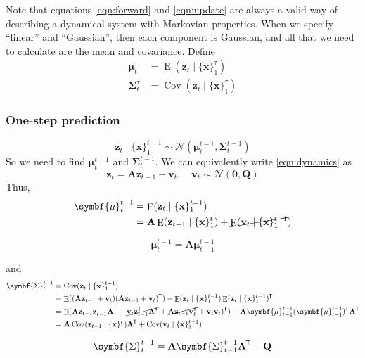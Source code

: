 \documentclass[11pt]{article}
\DeclareMathOperator{\E}{E}
\DeclareMathOperator{\Cov}{Cov}
\newcommand{\xb}{\mathbf{x}}
\newcommand{\zb}{\mathbf{z}}
\newcommand{\ub}{\symbf{\mu}}
\newcommand{\Sb}{\symbf{\Sigma}}
\newcommand{\Ab}{\mathbf{A}}
\newcommand{\Qb}{\mathbf{Q}}
\newcommand*{\tran}{^{\mkern-1.5mu\mathsf{T}}}
\begin{document}
Note that equations \eqref{eqn:forward} and \eqref{eqn:update} are always a
valid way of describing a dynamical system with Markovian properties. When
we specify ``linear'' and ``Gaussian'', then each component is Gaussian, and
all that we need to calculate are the mean and covariance. Define
\begin{align*}
  \ub_t^{\tau} &= \E(\zb_t \mid \{\xb\}_1^{\tau}) \\
  \Sb_t^{\tau} &= \Cov(\zb_t \mid \{\xb\}_1^{\tau})
\end{align*}

\subsubsection*{One-step prediction}
\begin{equation*}
  \zb_t \mid \{\xb\}_1^{t-1} \sim \mathcal{N}(\ub_t^{t-1}, \Sb_t^{t-1})
\end{equation*}
So we need to find $\ub_t^{t-1}$ and $\Sb_t^{t-1}$. We can equivalently write
\eqref{eqn:dynamics} as
\begin{equation*}
  \zb_t = \Ab \zb_{t-1} + \mathbf{v}_t, \quad \mathbf{v}_t \sim
    \mathcal{N}(\mathbf{0}, \Qb)
\end{equation*}
Thus,
\begin{align*}
  \ub_t^{t-1} &= \E(\zb_t \mid \{\xb\}_1^{t-1}) \\
  &= \Ab  \E(\zb_{t-1} \mid \{\xb\}_1^{t}) +
    \cancel{\E(\mathbf{v}_t \mid \{\xb\}_1^{t-1})}
\end{align*}
\begin{framed}
  \begin{equation}
    \ub_t^{t-1} = \Ab \ub_{t-1}^{t-1}
  \end{equation}
\end{framed}
and
\begin{align*}
  \Sb_t^{t-1} &= \Cov(\zb_t \mid \{\xb\}_1^{t-1}) \\
  &= \E((\Ab \zb_{t-1} + \mathbf{v}_t) (\Ab \zb_{t-1} + \mathbf{v}_t)\tran) -
     \E(\zb_t \mid \{\xb\}_1^{t-1}) \E(\zb_t \mid \{\xb\}_1^{t-1})\tran \\
  &= \E(\Ab \zb_{t-1} \zb_{t-1}\tran \Ab\tran +
      \cancel{\mathbf{v}_t \zb_{t-1}\tran \Ab\tran} +
      \cancel{\Ab \zb_{t-1} \mathbf{v}_t\tran} +
      \mathbf{v}_t \mathbf{v}_t)\tran) -
      \Ab \ub_{t-1}^{t-1} (\ub_{t-1}^{t-1})\tran \Ab\tran \\
  &= \Ab  \Cov(\zb_{t-1} \mid \{\xb\}_1^{t}) \Ab\tran +
    \Cov(\mathbf{v}_t \mid \{\xb\}_1^{t-1})
\end{align*}
\begin{framed}
  \begin{equation}
    \Sb_t^{t-1} = \Ab \Sb_{t-1}^{t-1} \Ab\tran + \Qb
  \end{equation}
\end{framed}
\end{document}
